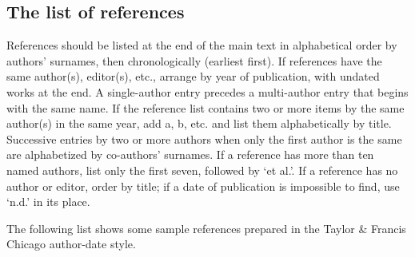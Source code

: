 \documentclass[]{interact}
\theoremstyle{plain}%
\theoremstyle{definition}
\theoremstyle{remark}
\begin{document}
\hypertarget{the-list-of-references}{%
\subsection{The list of references}\label{the-list-of-references}}

References should be listed at the end of the main text in alphabetical
order by authors' surnames, then chronologically (earliest first). If
references have the same author(s), editor(s), etc., arrange by year of
publication, with undated works at the end. A single-author entry
precedes a multi-author entry that begins with the same name. If the
reference list contains two or more items by the same author(s) in the
same year, add a, b, etc. and list them alphabetically by title.
Successive entries by two or more authors when only the first author is
the same are alphabetized by co-authors' surnames. If a reference has
more than ten named authors, list only the first seven, followed by `et
al.'. If a reference has no author or editor, order by title; if a date
of publication is impossible to find, use `n.d.' in its place.

The following list shows some sample references prepared in the Taylor
\& Francis Chicago author-date style.

\citep{Ade09, Alb05}






\end{document}

